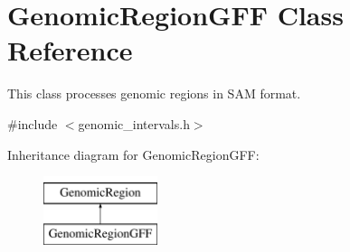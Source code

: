\hypertarget{classGenomicRegionGFF}{
\section{GenomicRegionGFF Class Reference}
\label{classGenomicRegionGFF}
}


This class processes genomic regions in SAM format.  




{\ttfamily \#include $<$genomic\_\-intervals.h$>$}

Inheritance diagram for GenomicRegionGFF:\begin{figure}[H]
\begin{center}
\leavevmode
\includegraphics[height=2.000000cm]{classGenomicRegionGFF}
\end{center}
\end{figure}
